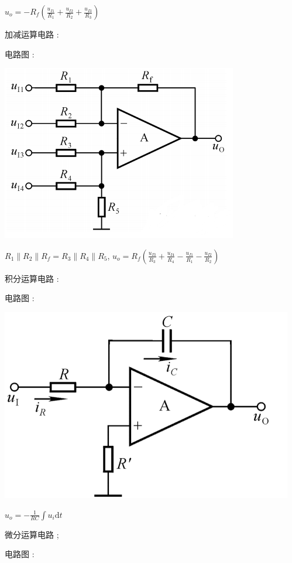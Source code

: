 \documentclass[UTF8, 12pt]{ctexart}
\begin{document}
	$ u_{o} = -R_{f}(\frac{u_{I1}}{R_{1}}+\frac{u_{I2}}{R_{2}}+\frac{u_{I3}}{R_{3}}) $

	加减运算电路 :

	电路图 :

	\includegraphics[scale = 0.4]{07/加减运算电路电路图.png}

	$ R_{1} \parallel R_{2} \parallel R_{f} = R_{3} \parallel R_{4} \parallel R_{5} $, $ u_{o} = R_{f}(\frac{u_{I3}}{R_{3}}+\frac{u_{I4}}{R_{4}}-\frac{u_{I1}}{R_{1}}-\frac{u_{I2}}{R_{2}}) $

	积分运算电路 :

	电路图 :

	\includegraphics[scale = 0.4]{07/积分运算电路电路图.png}

	$ u_{o} = -\frac{1}{RC} \int u_{i}\mathrm{d}t $

	微分运算电路 ;

	电路图 :
\end{document}
